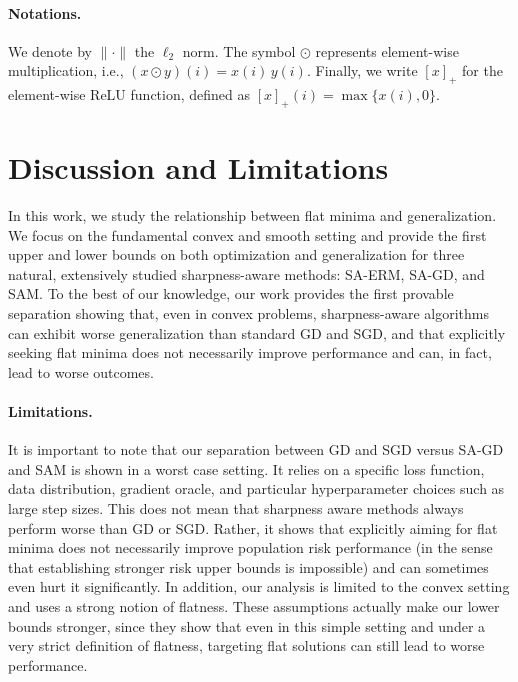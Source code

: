 \documentclass[11pt]{article}
\begin{document}
\paragraph{Notations.} We denote by $\|\cdot\|$ the $\ell_2$ norm. 
The symbol $\odot$ represents element-wise multiplication, i.e.,
$(x \odot y)(i) = x(i)\, y(i).$
Finally, we write $[x]_+$ for the element-wise ReLU function, defined as $[x]_+(i) = \max\{x(i), 0\}$.
















\section{Discussion and Limitations}

In this work, we study the relationship between flat minima and generalization. We focus on the fundamental convex and smooth setting and provide the first upper and lower bounds on both optimization and generalization for three natural, extensively studied sharpness-aware methods: SA-ERM, SA-GD, and SAM.
To the best of our knowledge, our work provides the first provable separation showing that, even in convex problems, sharpness-aware algorithms can exhibit worse generalization than standard GD and SGD, and that explicitly seeking flat minima does not necessarily improve performance and can, in fact, lead to worse outcomes. 

\paragraph{Limitations.}
It is important to note that our separation between GD and SGD versus SA-GD and SAM is shown in a worst case setting. It relies on a specific loss function, data distribution, gradient oracle, and particular hyperparameter choices such as large step sizes. 
This does not mean that sharpness aware methods always perform worse than GD or SGD. Rather, it shows that explicitly aiming for flat minima does not necessarily improve population risk performance (in the sense that establishing stronger risk upper bounds is impossible) and can sometimes even hurt it significantly.
In addition, our analysis is limited to the convex setting and uses a strong notion of flatness. These assumptions actually make our lower bounds stronger, since they show that even in this simple setting and under a very strict definition of flatness, targeting flat solutions can still lead to worse performance.
\end{document}
